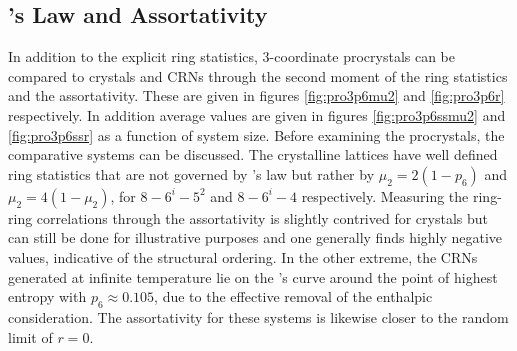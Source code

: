 \subsection{\lm's Law and Assortativity}

In addition to the explicit ring statistics, 3\--coordinate procrystals can be compared to crystals and CRNs through the second moment of the ring statistics and the assortativity.
These are given in figures \ref{fig:pro3p6mu2} and \ref{fig:pro3p6r} respectively.
In addition average values are given in figures \ref{fig:pro3p6ssmu2} and \ref{fig:pro3p6ssr} as a function of system size.
Before examining the procrystals, the comparative systems can be discussed.
The crystalline lattices have well defined ring statistics that are not governed by \lm's law but rather by $\mu_2=2\left(1-p_6\right)$ and $\mu_2=4\left(1-\mu_2\right)$, for $8-6^i-5^2$ and $8-6^i-4$ respectively. 
Measuring the ring\--ring correlations through the assortativity is slightly contrived for crystals but can still be done for illustrative purposes and one generally finds highly negative values, indicative of the structural ordering.  %
In the other extreme, the CRNs generated at infinite temperature lie on the \lm's curve around the point of highest entropy \ie{} with $p_6\approx 0.105$, due to the effective removal of the enthalpic consideration.
The assortativity for these systems is likewise closer to the random limit of $r=0$.

